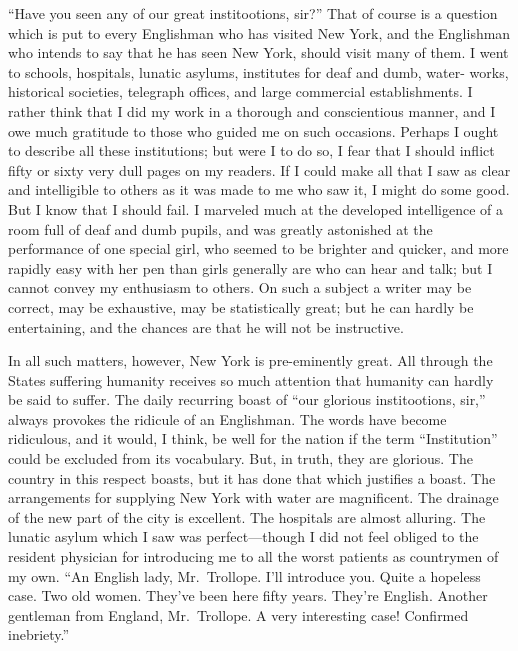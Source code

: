 ``Have you seen any of our great institootions, sir?''  That of
course is a question which is put to every Englishman who has
visited New York, and the Englishman who intends to say that he has
seen New York, should visit many of them.  I went to schools,
hospitals, lunatic asylums, institutes for deaf and dumb, water-
works, historical societies, telegraph offices, and large
commercial establishments.  I rather think that I did my work in a
thorough and conscientious manner, and I owe much gratitude to
those who guided me on such occasions.  Perhaps I ought to describe
all these institutions; but were I to do so, I fear that I should
inflict fifty or sixty very dull pages on my readers.  If I could
make all that I saw as clear and intelligible to others as it was
made to me who saw it, I might do some good.  But I know that I
should fail.  I marveled much at the developed intelligence of a
room full of deaf and dumb pupils, and was greatly astonished at
the performance of one special girl, who seemed to be brighter and
quicker, and more rapidly easy with her pen than girls generally
are who can hear and talk; but I cannot convey my enthusiasm to
others.  On such a subject a writer may be correct, may be
exhaustive, may be statistically great; but he can hardly be
entertaining, and the chances are that he will not be instructive.

In all such matters, however, New York is pre-eminently great.  All
through the States suffering humanity receives so much attention
that humanity can hardly be said to suffer.  The daily recurring
boast of ``our glorious institootions, sir,'' always provokes the
ridicule of an Englishman.  The words have become ridiculous, and
it would, I think, be well for the nation if the term ``Institution''
could be excluded from its vocabulary.  But, in truth, they are
glorious.  The country in this respect boasts, but it has done that
which justifies a boast.  The arrangements for supplying New York
with water are magnificent.  The drainage of the new part of the
city is excellent.  The hospitals are almost alluring.  The lunatic
asylum which I saw was perfect---though I did not feel obliged to
the resident physician for introducing me to all the worst patients
as countrymen of my own.  ``An English lady, Mr.\ Trollope.  I'll
introduce you.  Quite a hopeless case.  Two old women.  They've
been here fifty years.  They're English.  Another gentleman from
England, Mr.\ Trollope.  A very interesting case!  Confirmed
inebriety.''

